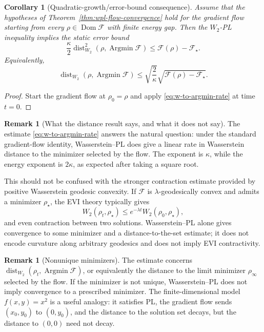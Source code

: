\documentclass[11pt]{article}
\newtheorem{corollary}[theorem]{Corollary}
\theoremstyle{definition}
\newtheorem{remark}[theorem]{Remark}
\newcommand{\F}{\mathcal F}
\newcommand{\W}{W_2}
\newcommand{\rhostar}{\rho_\star}
\newcommand{\distW}{\operatorname{dist}_{\W}}
\begin{document}
\begin{corollary}[Quadratic-growth/error-bound consequence]
\label{cor:wpl-qg}
Assume that the hypotheses of Theorem~\ref{thm:wpl-flow-convergence} hold for the gradient flow starting from every $\rho\in\operatorname{Dom}\F$ with finite energy gap. Then the $\W$-PL inequality implies the static error bound
\begin{equation}
        \frac{\kappa}{2}
        \distW^2(\rho,\operatorname{Argmin}\F)
        \le
        \F(\rho)-\F_\star.
        \label{eq:qg-from-wpl}
\end{equation}
Equivalently,
\begin{equation}
        \distW(\rho,\operatorname{Argmin}\F)
        \le
        \sqrt{\frac{2}{\kappa}}
        \sqrt{\F(\rho)-\F_\star}.
        \label{eq:error-bound-from-wpl}
\end{equation}
\end{corollary}

\begin{proof}
Start the gradient flow at $\rho_0=\rho$ and apply \eqref{eq:w-to-argmin-rate} at time $t=0$.
\end{proof}

\begin{remark}[What the distance result says, and what it does not say]
The estimate \eqref{eq:w-to-argmin-rate} answers the natural question: under the standard gradient-flow identity, Wasserstein--PL does give a linear rate in Wasserstein distance to the minimizer selected by the flow. The exponent is $\kappa$, while the energy exponent is $2\kappa$, as expected after taking a square root.

This should not be confused with the stronger contraction estimate provided by positive Wasserstein geodesic convexity. If $\F$ is $\lambda$-geodesically convex and admits a minimizer $\rhostar$, the EVI theory typically gives
\[
        \W(\rho_t,\rhostar)
        \le e^{-\lambda t}\W(\rho_0,\rhostar),
\]
and even contraction between two solutions. Wasserstein--PL alone gives convergence to some minimizer and a distance-to-the-set estimate; it does not encode curvature along arbitrary geodesics and does not imply EVI contractivity.
\end{remark}

\begin{remark}[Nonunique minimizers]
The estimate concerns $\distW(\rho_t,\operatorname{Argmin}\F)$, or equivalently the distance to the limit minimizer $\rho_\infty$ selected by the flow. If the minimizer is not unique, Wasserstein--PL does not imply convergence to a prescribed minimizer. The finite-dimensional model $f(x,y)=x^2$ is a useful analogy: it satisfies PL, the gradient flow sends $(x_0,y_0)$ to $(0,y_0)$, and the distance to the solution set decays, but the distance to $(0,0)$ need not decay.
\end{remark}
\end{document}
